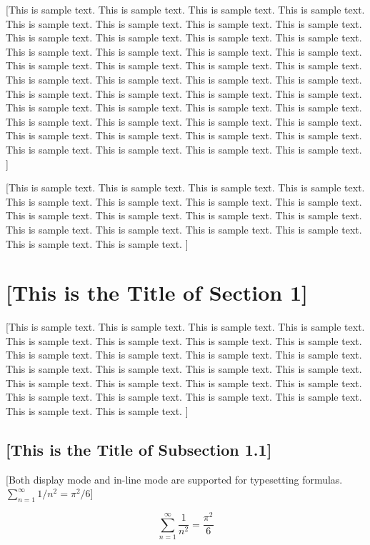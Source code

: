 \documentclass[a4paper,11pt,onecolumn,twoside]{article}
\begin{document}
[This is sample text. This is sample text. This is sample text. This is sample text. This is sample text. This is sample text. This is sample text. This is sample text. This is sample text. This is sample text. This is sample text. This is sample text. This is sample text. This is sample text. This is sample text. This is sample text. This is sample text. This is sample text. This is sample text. This is sample text. This is sample text. This is sample text. This is sample text. This is sample text. This is sample text. This is sample text. This is sample text. This is sample text. This is sample text. This is sample text. This is sample text. This is sample text. This is sample text. This is sample text. This is sample text. This is sample text. This is sample text. This is sample text. This is sample text. This is sample text. This is sample text. This is sample text. This is sample text. This is sample text. ]

[This is sample text. This is sample text. This is sample text. This is sample text. This is sample text. This is sample text. This is sample text. This is sample text. This is sample text. This is sample text. This is sample text. This is sample text. This is sample text. This is sample text. This is sample text. This is sample text. This is sample text. This is sample text. ]

\section{[This is the Title of Section 1]}
[This is sample text. This is sample text. This is sample text. This is sample text. This is sample text. This is sample text. This is sample text. This is sample text. This is sample text. This is sample text. This is sample text. This is sample text. This is sample text. This is sample text. This is sample text. This is sample text. This is sample text. This is sample text. This is sample text. This is sample text. This is sample text. This is sample text. This is sample text. This is sample text. This is sample text. This is sample text. ]

\subsection{[This is the Title of Subsection 1.1]}
[Both display mode and in-line mode are supported for typesetting formulas. $\sum_{n = 1} ^ {\infty} 1/n^2 = \pi^2/6 $]

$$ \sum_{n=1}^{\infty} \frac{1}{n^2} = \frac{\pi^2}{6} $$
\end{document}
